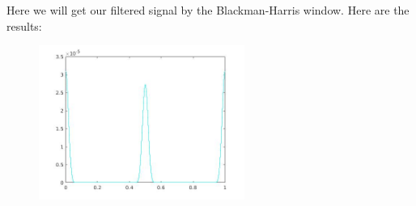 \documentclass[a4paper,11pt]{article}
\begin{document}
Here we will get our filtered signal by the Blackman-Harris window. Here are the results:

\begin{figure}[!hp]
    \begin{center}
      \includegraphics[width=0.6\textwidth]{images/lab2_89.jpg}
    \end{center}
\end{figure}

\newpage
\end{document}
